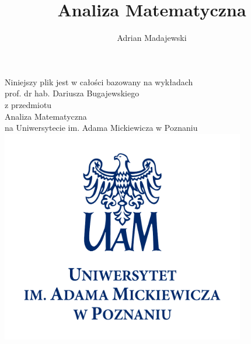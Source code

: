 \documentclass[leqno]{article}
\title{\Huge{Analiza Matematyczna}}
\author{Adrian Madajewski}
\date{}
\begin{document}

\maketitle

\begin{center}
    Niniejszy plik jest w całości bazowany na wykładach \\
    \vspace{10pt}
    prof. dr hab. Dariusza Bugajewskiego \\
    \vspace{10pt}
    z przedmiotu \\
    \vspace{10pt}
    Analiza Matematyczna\\
    \vspace{10pt}
    na Uniwersytecie im. Adama Mickiewicza w Poznaniu
    \includegraphics[width=0.8\textwidth]{uam_logo.pdf}
\end{center}
\newpage
\end{document}
